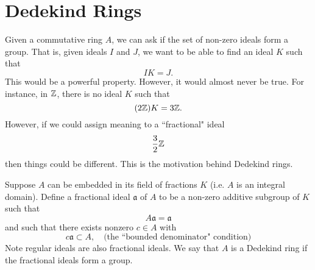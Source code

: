 \section{Dedekind Rings}
Given a commutative ring $A$, we can ask if the set of non-zero ideals form a group. That is, given ideals $I$ and $J$, we want to be able to find an ideal $K$ such that
\[
    IK = J.
\]
This would be a powerful property. However, it would almost never be true. For instance, in ${\mathbb Z}$, there is no ideal $K$ such that
\[
    (2{\mathbb Z})K = 3{\mathbb Z}.
\]
However, if we could assign meaning to a ``fractional" ideal
\[
    \frac{3}{2}{\mathbb Z}
\]
then things could be different. This is the motivation behind Dedekind rings.

Suppose $A$ can be embedded in its field of fractions $K$ (i.e. $A$ is an integral domain). Define a fractional ideal $\mathfrak a$ of $A$ to be a non-zero additive subgroup of $K$ such that
\[
    A\mathfrak a = \mathfrak a
\]
and such that there exists nonzero $c \in A$ with
\[
    c\mathfrak a \subset A, \quad \text{(the ``bounded denominator" condition)}
\]
Note regular ideals are also fractional ideals. We say that $A$ is a Dedekind ring if the fractional ideals form a group.
